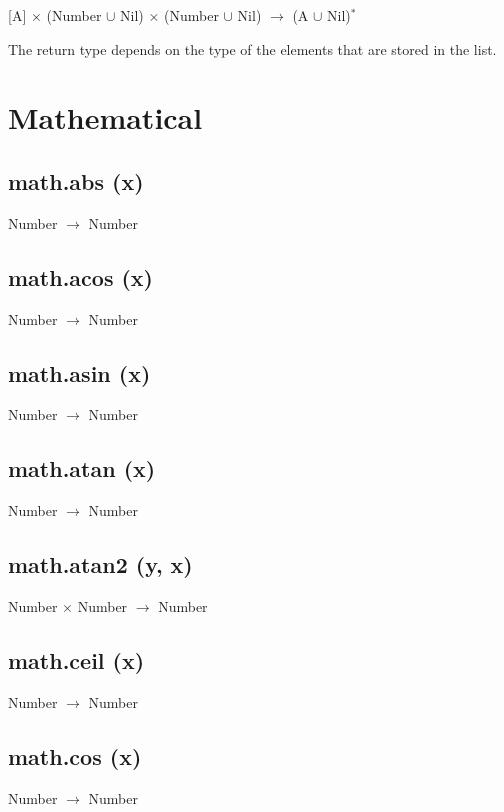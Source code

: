 \documentclass[12pt]{article}
\begin{document}
[A] $\times$
(Number $\cup$ Nil) $\times$
(Number $\cup$ Nil) $\rightarrow$
(A $\cup$ Nil)$^*$

The return type depends on the type of the elements that are stored in
the list.

\newpage

\section{Mathematical}

\subsection{math.abs (x)}

Number $\rightarrow$ Number

\subsection{math.acos (x)}

Number $\rightarrow$ Number

\subsection{math.asin (x)}

Number $\rightarrow$ Number

\subsection{math.atan (x)}

Number $\rightarrow$ Number

\subsection{math.atan2 (y, x)}

Number $\times$ Number $\rightarrow$ Number

\subsection{math.ceil (x)}

Number $\rightarrow$ Number

\subsection{math.cos (x)}

Number $\rightarrow$ Number
\end{document}
